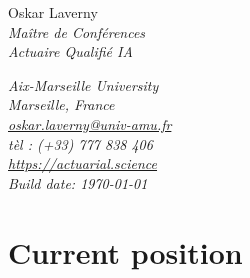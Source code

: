 \documentclass[a4paper,11pt]{article}
\newcommand*{\namefont}{\fontsize{28}{30}\mdseries\upshape}
\newcommand*{\titlefont}{\LARGE\mdseries\slshape}
\newcommand*{\addressfont}{\small\mdseries\slshape}
\newcommand*{\namestyle}[1]{{\namefont\textcolor{color0}{#1}}}
\newcommand*{\titlestyle}[1]{{\titlefont\textcolor{color2}{#1}}}
\newcommand*{\addressstyle}[1]{{\addressfont\textcolor{color2}{#1}}}
\begin{document}
\begin{multicols}{2}\raggedright
\namestyle{Oskar Laverny} \\
\vspace{0.5cm}
\titlestyle{Maître de Conférences}\\
\vspace{0.2cm}
\titlestyle{Actuaire Qualifié IA}
\columnbreak

\raggedleft
\addressstyle{
Aix-Marseille University\\
Marseille, France\\
\url{oskar.laverny@univ-amu.fr}\\
tèl : (+33) 777 838 406\\
\url{https://actuarial.science}\\
Build date: \today
}
\end{multicols}
\vspace{0.2cm}
\section{Current position}\label{subsec:act_pro_actuelle}
\end{document}
